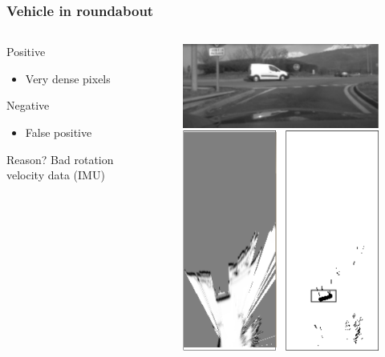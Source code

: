 \documentclass{beamer}
\begin{document}
	\begin{frame}
		\frametitle{Vehicle in roundabout}
		\begin{columns}[t]
			\begin{column}[t]{5cm}
				\begin{exampleblock}{Positive}
				\begin{itemize}
				\item Very dense pixels
				\end{itemize}
				\end{exampleblock}
								
				\begin{alertblock}{Negative}
				\begin{itemize}
				\item False positive 
				\end{itemize}
				\end{alertblock}					
				\begin{block}{Reason?}
				Bad rotation velocity data (IMU)
				\end{block}			
			\end{column}
			\begin{column}[t]{5cm}
				\begin{figure}[h]
				\center
				\includegraphics[scale=0.55]{../img/fig:result:scenetwocarrondepoint}
				\end{figure}
			\end{column}
		\end{columns}
	\end{frame}
\end{document}
